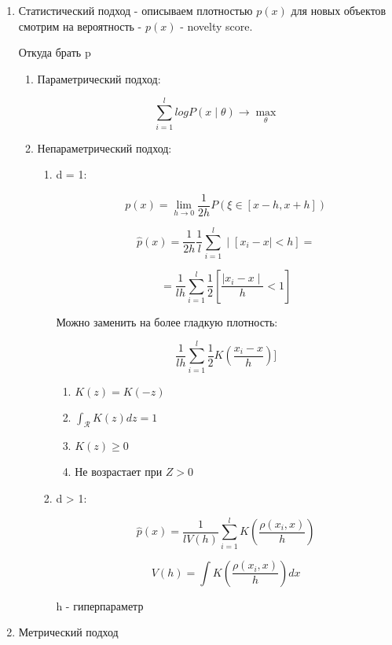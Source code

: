\documentclass[a4paper, 12pt]{article}
\begin{document}
\begin{enumerate}
    \item Статистический подход - описываем плотностью $p(x)$ для
    новых объектов смотрим на вероятность - $p(x)$ - novelty score.

    Откуда брать p
    \begin{enumerate}
        \item Параметрический подход:
        
        \[\sum_{i = 1}^l logP(x \mid \theta) 
        \rightarrow \max_{\theta}\]
        \item Непараметрический подход:
        \begin{enumerate}
            \item d = 1:
            
            \[p(x) = \lim_{h \to 0} 
            \frac{1}{2h}P(\xi \in [x - h, x + h])\]

            \[\hat{p}(x) = \frac{1}{2h}\frac{1}{l} 
            \sum_{i = 1}^l \mid [x_i - x \mid < h] =\]

            \[= \frac{1}{lh} \sum_{i = 1}^l 
            \frac{1}{2}[\frac{\mid x_i - x \mid}{h} < 1]\]

            Можно заменить на более гладкую плотность:

            \[\frac{1}{lh} \sum_{i = 1}^l 
            \frac{1}{2}K(\frac{x_i - x}{h})]\]

            \begin{enumerate}
                \item $K(z) = K(-z)$
                \item $\int_{\mathcal{R}} K(z)dz = 1$
                \item $K(z) \geq 0$
                \item Не возрастает при $Z > 0$
            \end{enumerate}
            \item d > 1:
            
            \[\hat{p}(x) = \frac{1}{lV(h)} \sum_{i = 1}^l 
            K(\frac{\rho(x_i, x)}{h})\]

            \[V(h) = \int K(\frac{\rho(x_i, x)}{h}) dx\]

            h - гиперпараметр
        \end{enumerate}
    \end{enumerate}

    \item Метрический подход
    

\end{enumerate}
\end{document}
